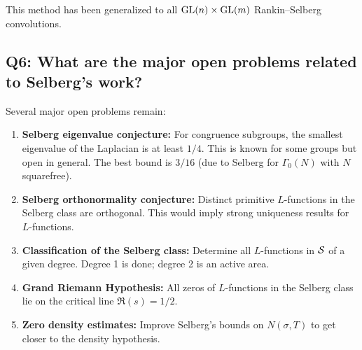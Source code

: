 This method has been generalized to all \(\operatorname{GL}(n) \times \operatorname{GL}(m)\) Rankin--Selberg convolutions.

\subsection*{Q6: What are the major open problems related to Selberg's work?}

Several major open problems remain:
\begin{enumerate}
    \item \textbf{Selberg eigenvalue conjecture:} For congruence subgroups, the smallest eigenvalue of the Laplacian is at least \(1/4\). This is known for some groups but open in general. The best bound is \(3/16\) (due to Selberg for \(\Gamma_0(N)\) with \(N\) squarefree).
    \item \textbf{Selberg orthonormality conjecture:} Distinct primitive \(L\)-functions in the Selberg class are orthogonal. This would imply strong uniqueness results for \(L\)-functions.
    \item \textbf{Classification of the Selberg class:} Determine all \(L\)-functions in \(\mathcal{S}\) of a given degree. Degree 1 is done; degree 2 is an active area.
    \item \textbf{Grand Riemann Hypothesis:} All zeros of \(L\)-functions in the Selberg class lie on the critical line \(\Re(s) = 1/2\).
    \item \textbf{Zero density estimates:} Improve Selberg's bounds on \(N(\sigma, T)\) to get closer to the density hypothesis.
\end{enumerate}

